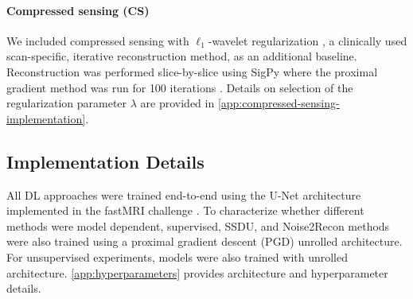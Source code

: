 \documentclass[10pt,twocolumn,letterpaper]{article}
\newcommand{\RV}[1]{{#1}}
\begin{document}
\paragraph{Compressed sensing (CS)} We included compressed sensing with $\ell_1$-wavelet regularization \cite{Lustig_Donoho_Pauly_2007}, a clinically used scan-specific, iterative reconstruction method, as an additional baseline. Reconstruction was performed slice-by-slice using SigPy where the proximal gradient method was run for \RV{100 iterations} \cite{sigpy}. Details on selection of the regularization parameter $\lambda$ are provided in \cref{app:compressed-sensing-implementation}.

\subsection{Implementation Details}
\label{sec:methods-implementation}
All DL approaches were trained end-to-end using the U-Net architecture implemented in the fastMRI challenge \cite{muckley2020state, ronneberger2015u}. \RV{To characterize whether different methods were model dependent, supervised, SSDU, and Noise2Recon methods were also trained using a proximal gradient descent (PGD) unrolled architecture. For unsupervised experiments, models were also trained with unrolled architecture. \cref{app:hyperparameters} provides architecture and hyperparameter details.}
\end{document}
